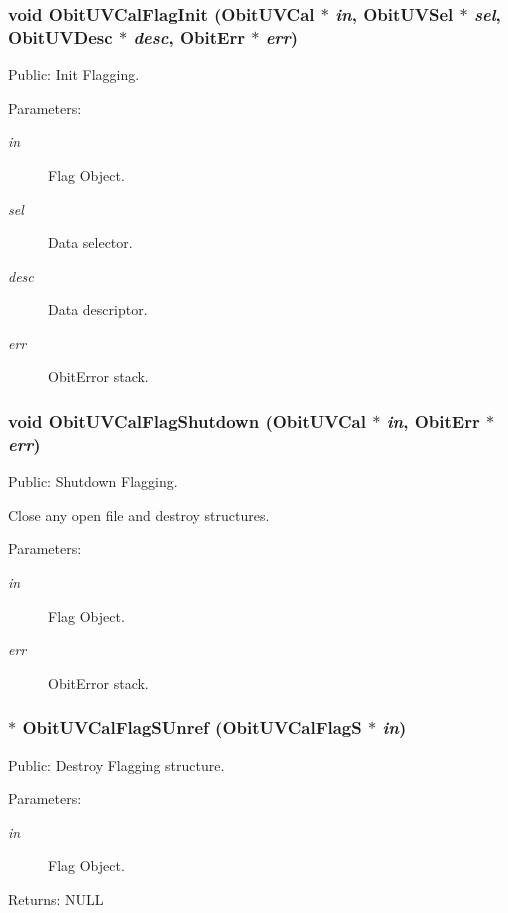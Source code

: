 \subsubsection{\setlength{\rightskip}{0pt plus 5cm}void Obit\-UVCal\-Flag\-Init ({\bf Obit\-UVCal} $\ast$ {\em in}, {\bf Obit\-UVSel} $\ast$ {\em sel}, {\bf Obit\-UVDesc} $\ast$ {\em desc}, {\bf Obit\-Err} $\ast$ {\em err})}\label{ObitUVCalFlag_8h_a0}


Public: Init Flagging. 

\begin{Desc}
\item[Parameters:]
\begin{description}
\item[{\em in}]Flag Object. \item[{\em sel}]Data selector. \item[{\em desc}]Data descriptor. \item[{\em err}]Obit\-Error stack. \end{description}
\end{Desc}
\subsubsection{\setlength{\rightskip}{0pt plus 5cm}void Obit\-UVCal\-Flag\-Shutdown ({\bf Obit\-UVCal} $\ast$ {\em in}, {\bf Obit\-Err} $\ast$ {\em err})}\label{ObitUVCalFlag_8h_a2}


Public: Shutdown Flagging. 

Close any open file and destroy structures. \begin{Desc}
\item[Parameters:]
\begin{description}
\item[{\em in}]Flag Object. \item[{\em err}]Obit\-Error stack. \end{description}
\end{Desc}
\subsubsection{$\ast$ Obit\-UVCal\-Flag\-SUnref ({\bf Obit\-UVCal\-Flag\-S} $\ast$ {\em in})}\label{ObitUVCalFlag_8h_a3}


Public: Destroy Flagging structure. 

\begin{Desc}
\item[Parameters:]
\begin{description}
\item[{\em in}]Flag Object. \end{description}
\end{Desc}
\begin{Desc}
\item[Returns:]NULL \end{Desc}

